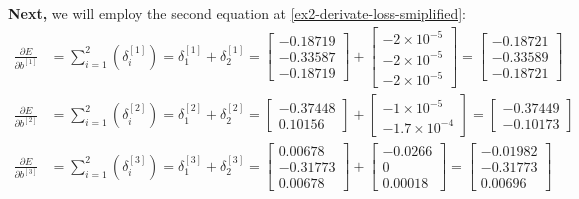 \documentclass[12pt]{article}
\begin{document}
\begin{enumerate}[leftmargin=\labelsep]
        \textbf{Next,} we will employ the second equation at \eqref{ex2-derivate-loss-smiplified}:
        \begingroup
        \allowdisplaybreaks
        \begin{align*}
          \frac{\partial E}{\partial b^{[1]}} & = \sum_{i=1}^{2} \left(\delta^{[1]}_i\right)
          = \delta^{[1]}_1 + \delta^{[1]}_2
          = \begin{bmatrix} -0.18719 \\ -0.33587 \\ -0.18719 \end{bmatrix} +
          \begin{bmatrix} -2 \times 10^{-5} \\ -2 \times 10^{-5} \\ -2 \times 10^{-5} \end{bmatrix}
          = \begin{bmatrix} -0.18721 \\ -0.33589 \\ -0.18721 \end{bmatrix}                   \\
          \frac{\partial E}{\partial b^{[2]}} & = \sum_{i=1}^{2} \left(\delta^{[2]}_i\right)
          = \delta^{[2]}_1 + \delta^{[2]}_2
          = \begin{bmatrix} -0.37448 \\ 0.10156 \end{bmatrix} +
          \begin{bmatrix} -1 \times 10^{-5} \\ -1.7 \times 10^{-4}  \end{bmatrix}
          = \begin{bmatrix} -0.37449 \\ -0.10173 \end{bmatrix}                               \\
          \frac{\partial E}{\partial b^{[3]}} & = \sum_{i=1}^{2} \left(\delta^{[3]}_i\right)
          = \delta^{[3]}_1 + \delta^{[3]}_2
          = \begin{bmatrix} 0.00678 \\ -0.31773 \\ 0.00678 \end{bmatrix} +
          \begin{bmatrix} -0.0266 \\ 0 \\ 0.00018 \end{bmatrix}
          = \begin{bmatrix} -0.01982 \\ -0.31773 \\ 0.00696 \end{bmatrix}
        \end{align*}
        \endgroup


\end{enumerate}
\end{document}
